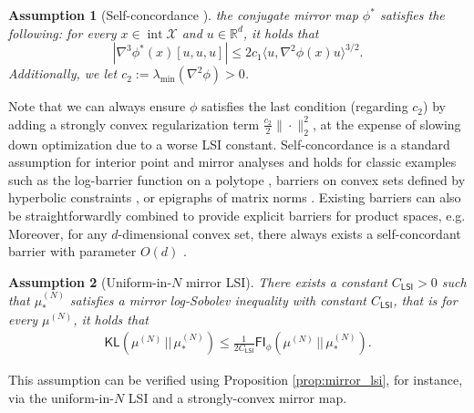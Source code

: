\documentclass{article}
\newtheorem{assumption}{Assumption}
\newtheorem{remark}{Remark}
\newcommand{\CLSI}[0]{C_{\mathsf{LSI}}}
\newcommand{\sep}[0]{\,||\,}
\newcommand{\KL}[0]{\mathsf{KL}}
\newcommand{\FI}[0]{\mathsf{FI}}
\begin{document}
\begin{assumption}[Self-concordance {\citep{gatmiry2022convergence}}]\label{asmp:self_concordance}
the conjugate mirror map $\phi^*$ satisfies the following: for every $x\in \operatorname{int}\mathcal{X}$ and $u\in\mathbb{R}^d$, it holds that \[
    |\nabla^3\phi^*(x)[u,u,u]| \le 2c_1\langle u, \nabla^2\phi(x)u\rangle^{3/2}.
    \]
Additionally, we let $c_2 := \lambda_{\min}(\nabla^2\phi)>0$.
\end{assumption}
Note that we can always ensure $\phi$ satisfies the last condition (regarding $c_2$) by adding a strongly convex regularization term $\frac{c_2}{2}\|\cdot\|_2^2$, at the expense of slowing down optimization due to a worse LSI constant.
Self-concordance is a standard assumption for interior point and mirror analyses \citep{nesterov1994interior,bubeck2015convex} and holds for classic examples such as the log-barrier function on a polytope \citep{gatmiry2022convergence}, barriers on convex sets defined by hyperbolic constraints \citep{Nar16}, or epigraphs of matrix norms \citep{nesterov1994interior}. Existing barriers can also be straightforwardly combined to provide explicit barriers for product spaces, e.g. Moreover, for any $d$-dimensional convex set, there always exists a self-concordant barrier with parameter $O(d)$ \citep{Nar16}. 


\begin{assumption}[Uniform-in-$N$ mirror LSI]\label{asmp:umlsi}
    There exists a constant $\CLSI> 0$ such that $\mu_*^{(N)}$ satisfies a mirror log-Sobolev inequality with constant $\CLSI$, that is for every $\mu^{(N)}$, it holds that
    \begin{align*}
\KL(\mu^{(N)}\sep\mu_*^{(N)}) \le \frac{1}{2\CLSI}\FI_\phi(\mu^{(N)}\sep\mu_*^{(N)}).
    \end{align*}
\end{assumption}
This assumption can be verified using Proposition \ref{prop:mirror_lsi}, for instance, via the uniform-in-$N$ LSI \citep{chewi2024uniform} and a strongly-convex mirror map.
\end{document}
